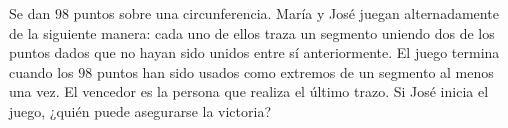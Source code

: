Se dan $98$ puntos sobre una circunferencia. María y José juegan alternadamente de la siguiente manera: cada uno de ellos traza un segmento uniendo dos de los puntos dados que no hayan sido unidos entre sí anteriormente. El juego termina cuando los $98$ puntos han sido usados como extremos de un segmento al menos una vez. El vencedor es la persona que realiza el último trazo. \newline 
Si José inicia el juego, ¿quién puede asegurarse la victoria?
